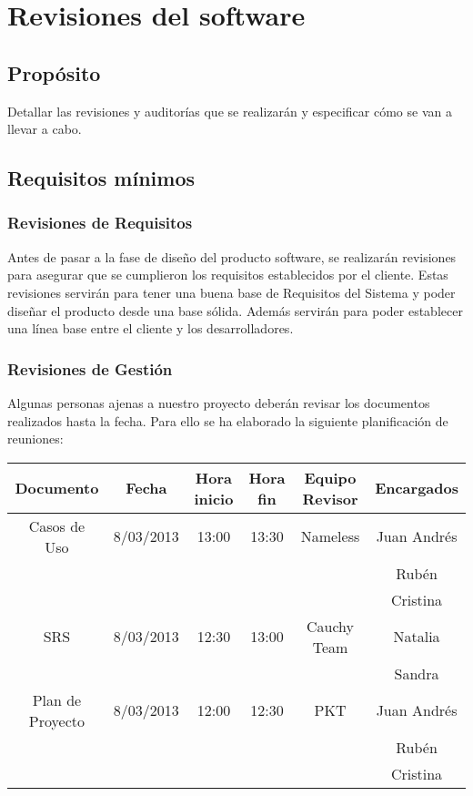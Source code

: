 \documentclass[11pt, a4paper, twoside, titlepage]{article}
\begin{document}
	\section{Revisiones del software} %

		\subsection{Propósito}
			Detallar las revisiones y auditorías que se realizarán y especificar cómo se van a llevar a cabo.

		\subsection{Requisitos mínimos}
			\subsubsection{Revisiones de Requisitos}
				Antes de pasar a la fase de diseño del producto software, se realizarán revisiones para asegurar que se cumplieron los requisitos establecidos por el cliente. Estas revisiones servirán para tener una buena base de Requisitos del Sistema y poder diseñar el producto desde una base sólida. %
 Además servirán para poder establecer una línea base entre el cliente y los desarrolladores. 
				
			\subsubsection{Revisiones de Gestión}
			Algunas personas ajenas a nuestro proyecto deberán revisar los documentos realizados hasta la fecha. Para ello se ha elaborado la siguiente planificación de reuniones: \\
			
			\begin{center}
				\begin{tabular}{| c | c | c | c | c | c |}
				\hline
				\bfseries Documento	& \bfseries Fecha & \bfseries Hora inicio & \bfseries Hora fin & \bfseries Equipo Revisor &  \bfseries Encargados \\ \hline
				Casos de Uso 		& 8/03/2013	& 13:00	& 13:30	& Nameless	& Juan Andrés	\\ 								&		&	&	&		& Rubén		\\
							&		&	&	&		& Cristina	\\ \hline
				SRS 			& 8/03/2013	& 12:30	& 13:00 & Cauchy Team 	& Natalia	\\
							&		&	&	&		& Sandra	\\ \hline
				Plan de Proyecto	& 8/03/2013	& 12:00 & 12:30 & PKT		& Juan Andrés	\\
							&		&	&	&		& Rubén		\\
							&		&	&	&		& Cristina	\\ \hline
				\end{tabular}
			\end{center}
			
\end{document}

